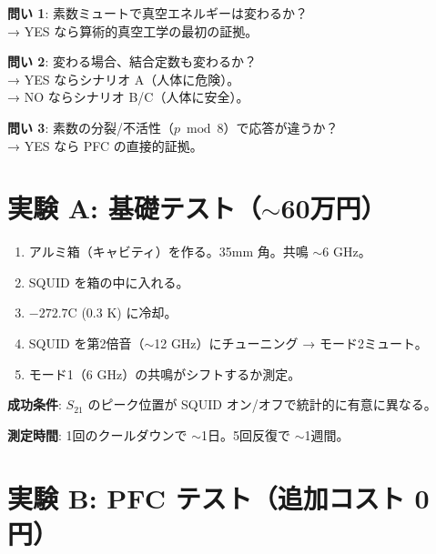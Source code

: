 \documentclass[12pt,a4paper]{article}
\begin{document}
\begin{expbox}
\textbf{問い 1}: 素数ミュートで真空エネルギーは変わるか？\\
→ YES なら算術的真空工学の最初の証拠。

\textbf{問い 2}: 変わる場合、結合定数も変わるか？\\
→ YES ならシナリオ A（人体に危険）。\\
→ NO ならシナリオ B/C（人体に安全）。

\textbf{問い 3}: 素数の分裂/不活性（$p \bmod 8$）で応答が違うか？\\
→ YES なら PFC の直接的証拠。
\end{expbox}

\section{実験 A: 基礎テスト（$\sim$60万円）}

\begin{expbox}[素数ミュートで真空は変わるか]
\begin{enumerate}
\item アルミ箱（キャビティ）を作る。35mm 角。共鳴 $\sim$6 GHz。
\item SQUID を箱の中に入れる。
\item $-272.7$\textdegree C (0.3 K) に冷却。
\item SQUID を第2倍音（$\sim$12 GHz）にチューニング → モード2ミュート。
\item モード1（6 GHz）の共鳴がシフトするか測定。
\end{enumerate}

\textbf{成功条件}: $S_{21}$ のピーク位置が SQUID オン/オフで統計的に有意に異なる。

\textbf{測定時間}: 1回のクールダウンで $\sim$1日。5回反復で $\sim$1週間。
\end{expbox}

\section{実験 B: PFC テスト（追加コスト 0 円）}
\end{document}
